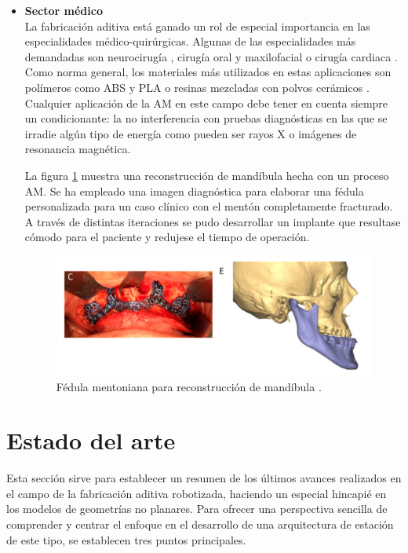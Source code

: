 \begin{itemize}
    \item \textbf{Sector médico}\\
    La fabricación aditiva está ganado un rol de especial importancia en las especialidades médico-quirúrgicas. Algunas de las especialidades más demandadas son neurocirugía \cite{Guarino2021}, cirugía oral y maxilofacial \cite{Zoabi2022} o cirugía cardiaca \cite{Vukicevic2017}. Como norma general, los materiales más utilizados en estas aplicaciones son polímeros como \acrshort{ABS} y \acrshort{PLA} o resinas mezcladas con polvos cerámicos \cite{Kumar2021}. Cualquier aplicación de la \acrshort{AM} en este campo debe tener en cuenta siempre un condicionante: la no interferencia con pruebas diagnósticas en las que se irradie algún tipo de energía como pueden ser rayos X o imágenes de resonancia magnética. 
    
    La figura \ref{fig:am_aplicaciones_medico} muestra una reconstrucción de mandíbula hecha con un proceso \acrshort{AM}. Se ha empleado una imagen diagnóstica para elaborar una fédula personalizada para un caso clínico con el mentón completamente fracturado. A través de distintas iteraciones se pudo desarrollar un implante que resultase cómodo para el paciente y redujese el tiempo de operación.

    \begin{figure}[h!]
        \centering
        \includegraphics[scale=0.25]{figuras/am_aplicaciones_medico.png}
        \caption{Fédula mentoniana para reconstrucción de mandíbula \cite{Zoabi2022}.}
        \label{fig:am_aplicaciones_medico}
    \end{figure}
\end{itemize}

\section{Estado del arte}
Esta sección sirve para establecer un resumen de los últimos avances realizados en el campo de la fabricación aditiva robotizada, haciendo un especial hincapié en los modelos de geometrías no planares. Para ofrecer una perspectiva sencilla de comprender y centrar el enfoque en el desarrollo de una arquitectura de estación de este tipo, se establecen tres puntos principales.

